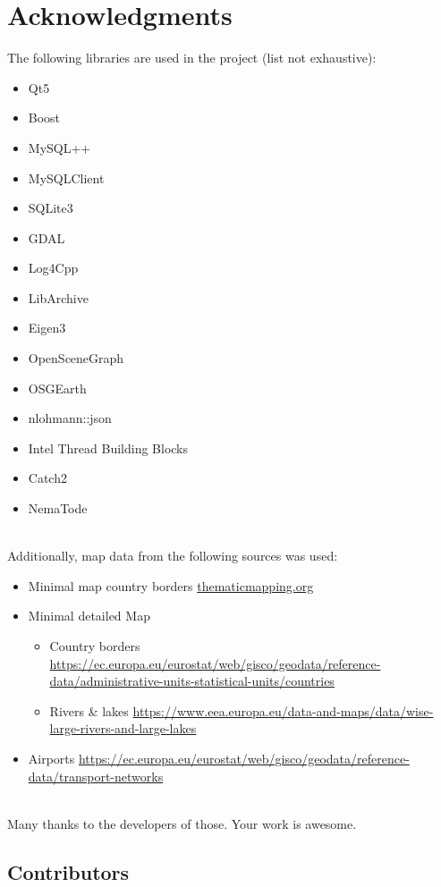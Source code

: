  \section{Acknowledgments}

The following libraries are used in the project (list not exhaustive):

\begin{itemize}  
\item Qt5
\item Boost
\item MySQL++
\item MySQLClient
\item SQLite3
\item GDAL
\item Log4Cpp
\item LibArchive
\item Eigen3
\item OpenSceneGraph
\item OSGEarth
\item nlohmann::json
\item Intel Thread Building Blocks
\item Catch2
\item NemaTode
\end{itemize}
\ \\

Additionally, map data from the following sources was used:
\begin{itemize}  
\item Minimal map country borders \url{thematicmapping.org}
\item Minimal detailed Map
\begin{itemize} 
\item Country borders \url{https://ec.europa.eu/eurostat/web/gisco/geodata/reference-data/administrative-units-statistical-units/countries}
\item Rivers \& lakes \url{https://www.eea.europa.eu/data-and-maps/data/wise-large-rivers-and-large-lakes}
\end{itemize}
\item Airports \url{https://ec.europa.eu/eurostat/web/gisco/geodata/reference-data/transport-networks}
\end{itemize}
\ \\
Many thanks to the developers of those. Your work is awesome.

\subsection{Contributors}

